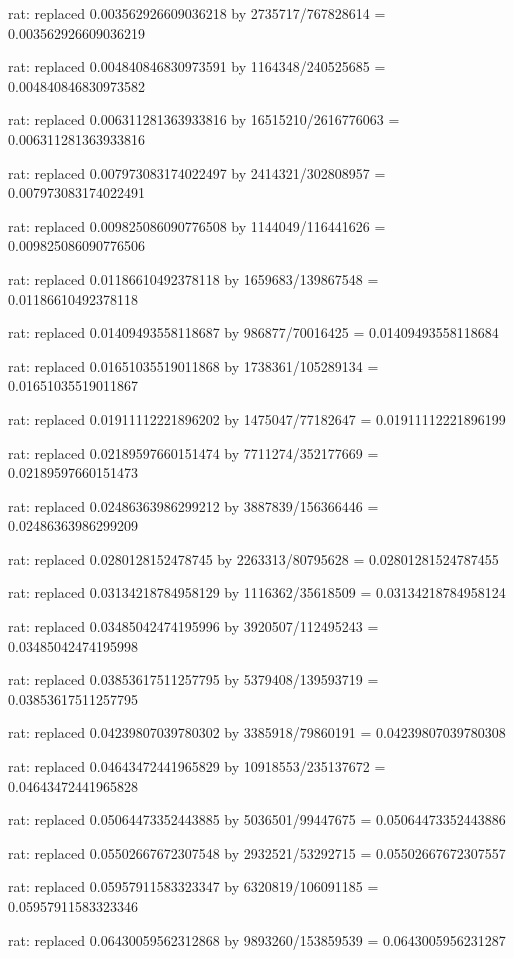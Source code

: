 \documentclass[a4paper,10pt]{article}
\begin{document}
\begin{eulernotebook}
\begin{eulercomment}
\begin{eulercomment}
\begin{eulercomment}
\begin{eulercomment}
\begin{eulercomment}
\begin{eulercomment}
\begin{eulercomment}
\begin{eulercomment}
\begin{eulercomment}
\begin{eulercomment}
\begin{eulercomment}
\begin{eulercomment}
\begin{eulercomment}
\begin{eulercomment}
\begin{eulercomment}
\begin{eulercomment}
\begin{euleroutput}
  rat: replaced 0.003562926609036218 by 2735717/767828614 = 0.003562926609036219
  
  rat: replaced 0.004840846830973591 by 1164348/240525685 = 0.004840846830973582
  
  rat: replaced 0.006311281363933816 by 16515210/2616776063 = 0.006311281363933816
  
  rat: replaced 0.007973083174022497 by 2414321/302808957 = 0.007973083174022491
  
  rat: replaced 0.009825086090776508 by 1144049/116441626 = 0.009825086090776506
  
  rat: replaced 0.01186610492378118 by 1659683/139867548 = 0.01186610492378118
  
  rat: replaced 0.01409493558118687 by 986877/70016425 = 0.01409493558118684
  
  rat: replaced 0.01651035519011868 by 1738361/105289134 = 0.01651035519011867
  
  rat: replaced 0.01911112221896202 by 1475047/77182647 = 0.01911112221896199
  
  rat: replaced 0.02189597660151474 by 7711274/352177669 = 0.02189597660151473
  
  rat: replaced 0.02486363986299212 by 3887839/156366446 = 0.02486363986299209
  
  rat: replaced 0.0280128152478745 by 2263313/80795628 = 0.02801281524787455
  
  rat: replaced 0.03134218784958129 by 1116362/35618509 = 0.03134218784958124
  
  rat: replaced 0.03485042474195996 by 3920507/112495243 = 0.03485042474195998
  
  rat: replaced 0.03853617511257795 by 5379408/139593719 = 0.03853617511257795
  
  rat: replaced 0.04239807039780302 by 3385918/79860191 = 0.04239807039780308
  
  rat: replaced 0.04643472441965829 by 10918553/235137672 = 0.04643472441965828
  
  rat: replaced 0.05064473352443885 by 5036501/99447675 = 0.05064473352443886
  
  rat: replaced 0.05502667672307548 by 2932521/53292715 = 0.05502667672307557
  
  rat: replaced 0.05957911583323347 by 6320819/106091185 = 0.05957911583323346
  
  rat: replaced 0.06430059562312868 by 9893260/153859539 = 0.0643005956231287
  

\end{euleroutput}
\end{eulercomment}
\end{eulercomment}
\end{eulercomment}
\end{eulercomment}
\end{eulercomment}
\end{eulercomment}
\end{eulercomment}
\end{eulercomment}
\end{eulercomment}
\end{eulercomment}
\end{eulercomment}
\end{eulercomment}
\end{eulercomment}
\end{eulercomment}
\end{eulercomment}
\end{eulercomment}
\end{eulernotebook}
\end{document}
